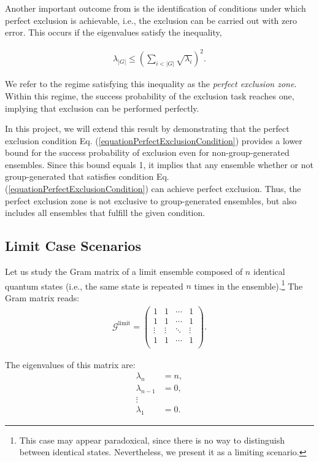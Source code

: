 \documentclass[12pt,letterpaper]{article}
\begin{document}
\begin{multicols}{2}
Another important outcome from \cite{MainPaper} is the identification of conditions under which perfect exclusion is achievable, i.e., the exclusion can be carried out with zero error. This occurs if the eigenvalues satisfy the inequality,

\begin{align}\label{equationPerfectExclusionCondition}
	\lambda_{|G|} \leq \left( \sum_{i<|G|} \sqrt{\lambda_i} \right)^2.
\end{align}

We refer to the regime satisfying this inequality as the \emph{perfect exclusion zone}. Within this regime, the success probability of the exclusion task reaches one, implying that exclusion can be performed perfectly.

In this project, we will extend this result by demonstrating that the perfect exclusion condition Eq. (\ref{equationPerfectExclusionCondition}) provides a lower bound for the success probability of exclusion even for non-group-generated ensembles. Since this bound equals 1, it implies that any ensemble whether or not group-generated that satisfies condition Eq. (\ref{equationPerfectExclusionCondition}) can achieve perfect exclusion. Thus, the perfect exclusion zone is not exclusive to group-generated ensembles, but also includes all ensembles that fulfill the given condition.

\subsection{Limit Case Scenarios}\label{sectionLimitCaseScenarios}

Let us study the Gram matrix of a limit ensemble composed of $n$ identical quantum states (i.e., the same state is repeated $n$ times in the ensemble).\footnote{This case may appear paradoxical, since there is no way to distinguish between identical states. Nevertheless, we present it as a limiting scenario.} The Gram matrix reads:
\begin{align*}
	\mathcal{G}^{\text{limit}} = \begin{pmatrix}
 1 & 1 & \cdots & 1 \\
 1 & 1 & \cdots & 1 \\
 \vdots & \vdots & \ddots & \vdots \\
 1 & 1 & \cdots & 1 \\
\end{pmatrix}.
\end{align*}

The eigenvalues of this matrix are:
\begin{align*}
	\lambda_n &= n, \\
	\lambda_{n-1} &= 0, \\
	\vdots \\
	\lambda_1 &= 0.
\end{align*}


\end{multicols}
\end{document}
